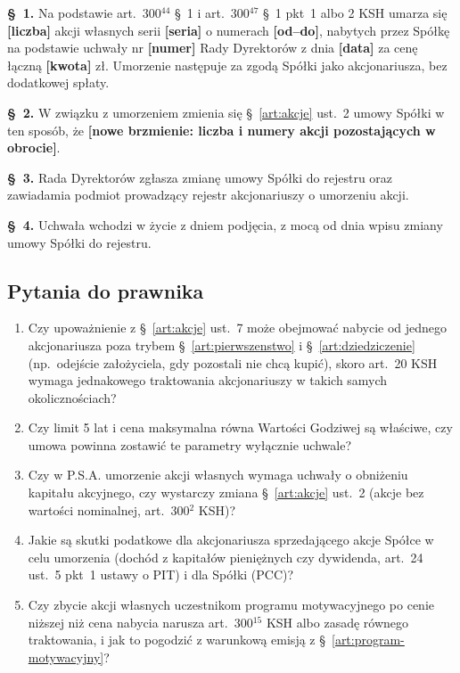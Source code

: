 \documentclass[12pt,a4paper]{report}
\newcommand{\field}[1]{\textbf{[#1]}}
\begin{document}
\textbf{§~1.} Na podstawie art.~300$^{44}$ §~1 i art.~300$^{47}$ §~1 pkt~1 albo 2 KSH umarza się \field{liczba} akcji własnych serii \field{seria} o numerach \field{od--do}, nabytych przez Spółkę na podstawie uchwały nr \field{numer} Rady Dyrektorów z dnia \field{data} za cenę łączną \field{kwota} zł. Umorzenie następuje za zgodą Spółki jako akcjonariusza, bez dodatkowej spłaty.

\textbf{§~2.} W związku z umorzeniem zmienia się §~\ref{art:akcje} ust.~2 umowy Spółki w ten sposób, że \field{nowe brzmienie: liczba i numery akcji pozostających w obrocie}.

\textbf{§~3.} Rada Dyrektorów zgłasza zmianę umowy Spółki do rejestru oraz zawiadamia podmiot prowadzący rejestr akcjonariuszy o umorzeniu akcji.

\textbf{§~4.} Uchwała wchodzi w życie z dniem podjęcia, z mocą od dnia wpisu zmiany umowy Spółki do rejestru.

\subsection*{Pytania do prawnika}

\begin{enumerate}
  \item Czy upoważnienie z §~\ref{art:akcje} ust.~7 może obejmować nabycie od jednego akcjonariusza poza trybem §~\ref{art:pierwszenstwo} i §~\ref{art:dziedziczenie} (np.\ odejście założyciela, gdy pozostali nie chcą kupić), skoro art.~20 KSH wymaga jednakowego traktowania akcjonariuszy w takich samych okolicznościach?
  \item Czy limit 5 lat i cena maksymalna równa Wartości Godziwej są właściwe, czy umowa powinna zostawić te parametry wyłącznie uchwale?
  \item Czy w P.S.A. umorzenie akcji własnych wymaga uchwały o obniżeniu kapitału akcyjnego, czy wystarczy zmiana §~\ref{art:akcje} ust.~2 (akcje bez wartości nominalnej, art.~300$^{2}$ KSH)?
  \item Jakie są skutki podatkowe dla akcjonariusza sprzedającego akcje Spółce w celu umorzenia (dochód z kapitałów pieniężnych czy dywidenda, art.~24 ust.~5 pkt~1 ustawy o PIT) i dla Spółki (PCC)?
  \item Czy zbycie akcji własnych uczestnikom programu motywacyjnego po cenie niższej niż cena nabycia narusza art.~300$^{15}$ KSH albo zasadę równego traktowania, i jak to pogodzić z warunkową emisją z §~\ref{art:program-motywacyjny}?
\end{enumerate}
\end{document}
